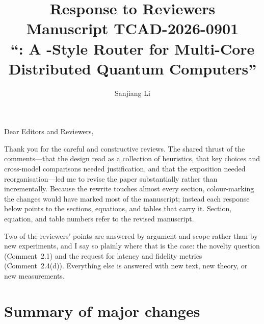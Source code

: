 \documentclass[11pt]{article}
\title{Response to Reviewers\\[3pt]
\large Manuscript TCAD-2026-0901\\
``\dSABRE{}: A \SABRE{}-Style Router for Multi-Core Distributed Quantum
Computers''}
\author{Sanjiang Li}
\date{}
\begin{document}
\maketitle

\noindent
Dear Editors and Reviewers,

\medskip\noindent
Thank you for the careful and constructive reviews. The shared thrust of the
comments---that the design read as a collection of heuristics, that key
choices and cross-model comparisons needed justification, and that the
exposition needed reorganisation---led me to revise the paper substantially
rather than incrementally. Because the rewrite touches almost every section,
colour-marking the changes would have marked most of the manuscript; instead
each response below points to the sections, equations, and tables that carry
it. Section, equation, and table numbers refer to the revised manuscript.

\medskip\noindent
Two of the reviewers' points are answered by argument and scope rather than by
new experiments, and I say so plainly where that is the case: the novelty
question (Comment~2.1) and the request for latency and fidelity metrics
(Comment~2.4(d)). Everything else is answered with new text, new theory, or
new measurements.

\section*{Summary of major changes}
\end{document}
